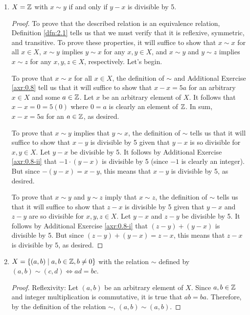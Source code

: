 \documentclass[../main.tex]{subfiles}
\begin{document}
\begin{exercise}
\begin{enumerate}[label={\alph*)},ref={\theexercise\alph*}]
\begin{proof}
        \end{proof}
        \item \label{exr:2.2d}$X=\mathbb{Z}$ with $x\sim y$ if and only if $y-x$ is divisible by 5.
        \begin{proof}
            To prove that the described relation is an equivalence relation, Definition \ref{dfn:2.1} tells us that we must verify that it is reflexive, symmetric, and transitive. To prove these properties, it will suffice to show that $x\sim x$ for all $x\in X$, $x\sim y$ implies $y\sim x$ for any $x,y\in X$, and $x\sim y$ and $y\sim z$ implies $x\sim z$ for any $x,y,z\in X$, respectively. Let's begin.\par
            To prove that $x\sim x$ for all $x\in X$, the definition of $\sim$ and Additional Exercise \ref{axr:0.8} tell us that it will suffice to show that $x-x=5a$ for an arbitrary $x\in X$ and some $a\in\mathbb{Z}$. Let $x$ be an arbitrary element of $X$. It follows that $x-x=0=5(0)$ where $0=a$ is clearly an element of $\mathbb{Z}$. In sum, $x-x=5a$ for an $a\in\mathbb{Z}$, as desired.\par
            To prove that $x\sim y$ implies that $y\sim x$, the definition of $\sim$ tells us that it will suffice to show that $x-y$ is divisible by 5 given that $y-x$ is so divisible for $x,y\in X$. Let $y-x$ be divisible by 5. It follows by Additional Exercise \ref{axr:0.8-ii} that $-1\cdot(y-x)$ is divisible by 5 (since $-1$ is clearly an integer). But since $-(y-x)=x-y$, this means that $x-y$ is divisible by 5, as desired.\par
            To prove that $x\sim y$ and $y\sim z$ imply that $x\sim z$, the definition of $\sim$ tells us that it will suffice to show that $z-x$ is divisible by 5 given that $y-x$ and $z-y$ are so divisible for $x,y,z\in X$. Let $y-x$ and $z-y$ be divisible by 5. It follows by Additional Exercise \ref{axr:0.8-i} that $(z-y)+(y-x)$ is divisible by 5. But since $(z-y)+(y-x)=z-x$, this means that $z-x$ is divisible by 5, as desired.
        \end{proof}
        \item \label{exr:2.2e}$X=\{(a,b)\mid a,b\in\mathbb{Z},b\neq 0\}$ with the relation $\sim$ defined by $(a,b)\sim(c,d)\Longleftrightarrow ad=bc$.
        \begin{proof}
            Reflexivity: Let $(a,b)$ be an arbitrary element of $X$. Since $a,b\in\mathbb{Z}$ and integer multiplication is commutative, it is true that $ab=ba$. Therefore, by the definition of the relation $\sim$, $(a,b)\sim(a,b)$.\par

\end{proof}
\end{enumerate}
\end{exercise}
\end{document}
